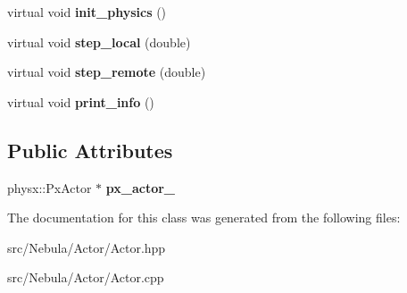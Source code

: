 \begin{DoxyCompactItemize}
\item 
\hypertarget{classNeb_1_1Actor_1_1Actor_af6dcb0fdb8d122abe63719ea6ecddf9f}{virtual void {\bfseries init\-\_\-physics} ()}\label{classNeb_1_1Actor_1_1Actor_af6dcb0fdb8d122abe63719ea6ecddf9f}

\item 
\hypertarget{classNeb_1_1Actor_1_1Actor_a26329a7f131b9b12b2b5f4975ccce437}{virtual void {\bfseries step\-\_\-local} (double)}\label{classNeb_1_1Actor_1_1Actor_a26329a7f131b9b12b2b5f4975ccce437}

\item 
\hypertarget{classNeb_1_1Actor_1_1Actor_a71f8ceecc1e04c4337e58b49c8de9502}{virtual void {\bfseries step\-\_\-remote} (double)}\label{classNeb_1_1Actor_1_1Actor_a71f8ceecc1e04c4337e58b49c8de9502}

\item 
\hypertarget{classNeb_1_1Actor_1_1Actor_aea510fcc7efe30f3eeb746526b736e48}{virtual void {\bfseries print\-\_\-info} ()}\label{classNeb_1_1Actor_1_1Actor_aea510fcc7efe30f3eeb746526b736e48}

\end{DoxyCompactItemize}
\subsection*{\-Public \-Attributes}
\begin{DoxyCompactItemize}
\item 
\hypertarget{classNeb_1_1Actor_1_1Actor_a09abac9a2f82780989321094de6d7bc3}{physx\-::\-Px\-Actor $\ast$ {\bfseries px\-\_\-actor\-\_\-}}\label{classNeb_1_1Actor_1_1Actor_a09abac9a2f82780989321094de6d7bc3}

\end{DoxyCompactItemize}


\-The documentation for this class was generated from the following files\-:\begin{DoxyCompactItemize}
\item 
src/\-Nebula/\-Actor/\-Actor.\-hpp\item 
src/\-Nebula/\-Actor/\-Actor.\-cpp\end{DoxyCompactItemize}
